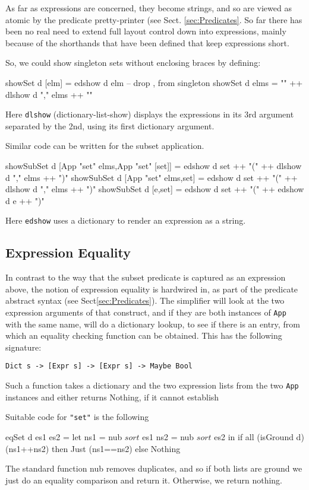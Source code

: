 As far as expressions are concerned,
they become strings, and so are viewed as atomic
by the predicate pretty-printer (see Sect. \ref{sec:Predicates}.
So far there has been no real need to extend full layout control
down into expressions,
mainly because of the shorthands that have been defined
that keep expressions short.

So, we could show singleton sets without enclosing braces
by defining:
\begin{code}
showSet d [elm] = edshow d elm      -- drop {,} from singleton
showSet d elms = "{" ++ dlshow d "," elms ++ "}"
\end{code}
Here \texttt{dlshow} (dictionary-list-show) displays the expressions
in its 3rd argument separated by the 2nd,
using its first dictionary argument.

Similar code can be written for the subset application.
\begin{code}
showSubSet d [App "set" elms,App "set" [set]]
 = edshow d set ++ "(" ++ dlshow d "," elms ++ ")"
showSubSet d [App "set" elms,set]
 = edshow d set ++ "(" ++ dlshow d "," elms ++ ")"
showSubSet d [e,set]
 = edshow d set ++ "(" ++ edshow d e ++ ")"
\end{code}
Here \texttt{edshow} uses a dictionary to render an expression as a string.

\subsection{Expression Equality}

In contrast to the way that the subset predicate
is captured as an expression above,
the notion of expression equality is hardwired in,
as part of the predicate abstract syntax (see Sect\ref{sec:Predicates}).
The simplifier will look at the two expression
arguments of that construct,
and if they are both instances of \texttt{App} with the same name,
will do a dictionary lookup, to see if there
is an entry, from
which an equality checking function can be obtained.
This has the following signature:
\begin{verbatim}
Dict s -> [Expr s] -> [Expr s] -> Maybe Bool
\end{verbatim}
Such a function takes a dictionary and the two expression
lists from the two \texttt{App} instances
and either returns Nothing, if it cannot establish

Suitable code for \verb$"set"$ is the following
\begin{code}
eqSet d es1 es2
 = let ns1 = nub $ sort $ es1
       ns2 = nub $ sort $ es2
   in if all (isGround d) (ns1++ns2)
      then Just (ns1==ns2)
      else Nothing
\end{code}
The standard function nub removes duplicates,
and so if both lists are ground we just do an equality comparison
and return it. Otherwise, we return nothing.


